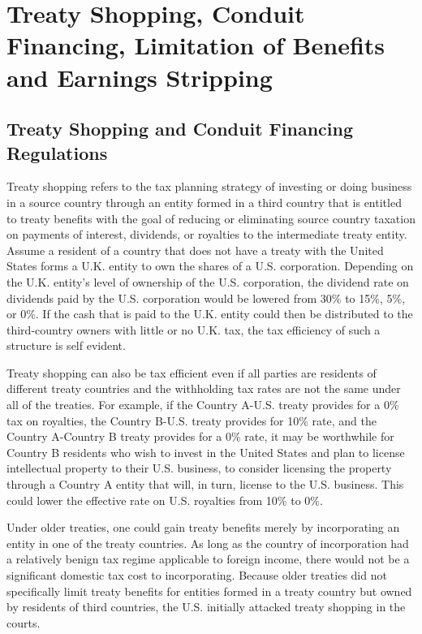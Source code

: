 \chapter{Treaty Shopping, Conduit Financing, Limitation of Benefits and Earnings Stripping}



\section{Treaty Shopping and Conduit Financing Regulations} 

Treaty shopping refers to the tax planning strategy of investing or doing business in a source country through an entity formed in a third country that is entitled to treaty benefits with the goal of reducing or eliminating source country taxation on payments of interest, dividends, or royalties to the intermediate treaty entity.  Assume a resident of a country that does not have a treaty with the United States forms a U.K. entity to own the shares of a U.S. corporation.  Depending on the U.K. entity's level of ownership of the U.S. corporation, the dividend rate on dividends paid by the U.S. corporation would be lowered from 30\% to 15\%, 5\%, or 0\%.  If the cash that is paid to the U.K. entity could then be distributed to the third-country owners with little or no U.K. tax, the tax efficiency of such a structure is self evident.  

Treaty shopping can also be tax efficient even if all parties are residents of different treaty countries and the withholding tax rates are not the same under all of the treaties.  For example, if the Country A-U.S. treaty provides for a 0\% tax on royalties, the Country B-U.S. treaty provides for 10\% rate, and the Country A-Country B treaty provides for a 0\% rate, it may be worthwhile for Country B residents who wish to invest in the United States and plan to license intellectual property to their U.S. business, to consider licensing the property through a Country A entity that will, in turn, license to the U.S. business.  This could lower the effective rate on U.S. royalties from 10\% to 0\%.

Under older treaties, one could gain treaty benefits merely by incorporating an entity in one of the treaty countries.  As long as the country of incorporation had a relatively benign tax regime applicable to foreign income, there would not be a significant domestic tax cost to incorporating.  Because older treaties did not specifically limit treaty benefits for entities formed in a treaty country but owned by residents of third countries, the U.S. initially attacked treaty shopping in the courts.  

